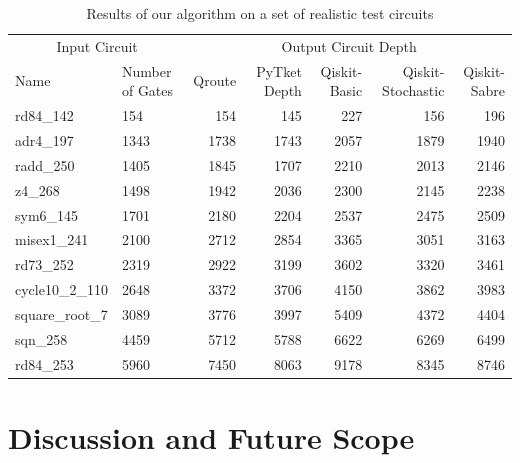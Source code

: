 \documentclass[%
 reprint,
 amsmath,amssymb,
 aps,
]{revtex4-2}
\begin{document}
\begin{table}[t]
    \caption{\label{tab:large-circuits}%
        Results of our algorithm on a set of realistic test circuits
    }
    \begin{ruledtabular}
        \begin{tabular}{ll|rrrrr}
            \multicolumn{2}{c}{\textrm{Input Circuit}} & \multicolumn{5}{c}{\textrm{Output Circuit Depth}} \\
            
            \textrm{Name} & \textrm{Number of Gates} & \textrm{Qroute} & \textrm{PyTket Depth} & \textrm{Qiskit-Basic} & \textrm{Qiskit-Stochastic} & \textrm{Qiskit-Sabre} \\
            
            \colrule
            rd84\_142 	    &  154 &  154 &  145 &  227 &  156 &  196 \\
            adr4\_197 	    & 1343 & 1738 & 1743 & 2057 & 1879 & 1940 \\
            radd\_250 	    & 1405 & 1845 & 1707 & 2210 & 2013 & 2146 \\
            z4\_268 	    & 1498 & 1942 & 2036 & 2300 & 2145 & 2238 \\
            sym6\_145 	    & 1701 & 2180 & 2204 & 2537 & 2475 & 2509 \\
            misex1\_241 	& 2100 & 2712 & 2854 & 3365 & 3051 & 3163 \\
            rd73\_252 	    & 2319 & 2922 & 3199 & 3602 & 3320 & 3461 \\
            cycle10\_2\_110 & 2648 & 3372 & 3706 & 4150 & 3862 & 3983 \\
            square\_root\_7 & 3089 & 3776 & 3997 & 5409 & 4372 & 4404 \\
            sqn\_258 	    & 4459 & 5712 & 5788 & 6622 & 6269 & 6499 \\
            rd84\_253 	    & 5960 & 7450 & 8063 & 9178 & 8345 & 8746 \\
        \end{tabular}
    \end{ruledtabular}
\end{table}


\section{\label{sec:discussion-conclusion}Discussion and Future Scope}
\end{document}
